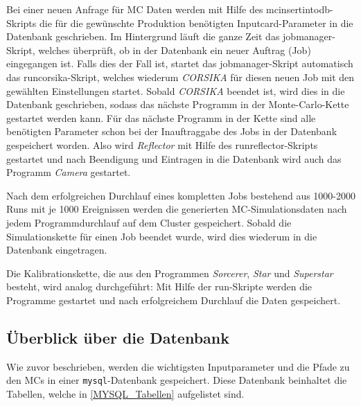 Bei einer neuen Anfrage für MC Daten werden mit Hilfe des mcinsertintodb-Skripts die für die gewünschte Produktion benötigten Inputcard-Parameter in die Datenbank geschrieben.
Im Hintergrund läuft die ganze Zeit das jobmanager-Skript, welches überprüft, ob in der Datenbank ein neuer Auftrag (Job) eingegangen ist.
Falls dies der Fall ist, startet das jobmanager-Skript automatisch das runcorsika-Skript, welches wiederum \textit{CORSIKA} für diesen neuen Job mit den gewählten Einstellungen startet.
Sobald \textit{CORSIKA} beendet ist, wird dies in die Datenbank geschrieben, sodass das nächste Programm in der Monte-Carlo-Kette gestartet werden kann.
Für das nächste Programm in der Kette sind alle benötigten Parameter schon bei der Inauftraggabe des Jobs in der Datenbank gespeichert worden.
Also wird \textit{Reflector} mit Hilfe des runreflector-Skripts gestartet und nach Beendigung und Eintragen in die Datenbank wird auch das Programm \textit{Camera} gestartet.

Nach dem erfolgreichen Durchlauf eines kompletten Jobs  bestehend aus 1000-2000 Runs mit je 1000 Ereignissen werden die generierten MC-Simulationsdaten nach jedem Programmdurchlauf auf dem Cluster gespeichert.
Sobald die Simulationskette für einen Job beendet wurde, wird dies wiederum in die Datenbank eingetragen.

Die Kalibrationskette, die aus den Programmen \textit{Sorcerer}, \textit{Star} und \textit{Superstar} besteht, wird analog durchgeführt:
Mit Hilfe der run-Skripte werden die Programme gestartet und nach erfolgreichem Durchlauf die Daten gespeichert.

\subsection{Überblick über die Datenbank}
Wie zuvor beschrieben, werden die wichtigsten Inputparameter und die Pfade zu den MCs in einer \texttt{mysql}-Datenbank gespeichert.
Diese Datenbank beinhaltet die Tabellen, welche in \autoref{MYSQL_Tabellen} aufgelistet sind.

